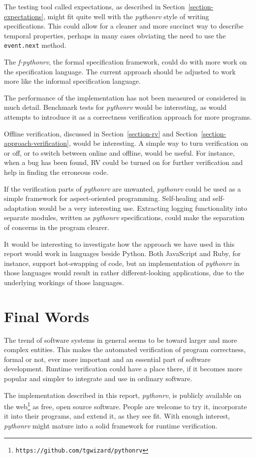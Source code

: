 The testing tool called expectations, as described in
Section~\ref{section-expectations}, might fit quite well with the
\textit{pythonrv} style of writing specifications. This could allow for a
cleaner and more succinct way to describe temporal properties, perhaps in many
cases obviating the need to use the \texttt{event.next} method.

The \textit{f-pythonrv}, the formal specification framework, could do with more
work on the specification language. The current approach should be adjusted to
work more like the informal specification language.

The performance of the implementation has not been measured or considered in
much detail. Benchmark tests for \textit{pythonrv} would be interesting, as
would attempts to introduce it as a correctness verification approach for more
programs.

Offline verification, discussed in Section~\ref{section-rv} and
Section~\ref{section-approach-verification}, would be interesting. A simple way
to turn verification on or off, or to switch between online and offline, would
be useful. For instance, when a bug has been found, RV could be turned on for
further verification and help in finding the erroneous code.

If the verification parts of \textit{pythonrv} are unwanted, \textit{pythonrv}
could be used as a simple framework for aspect-oriented programming.
Self-healing and self-adaptation would be a very interesting use. Extracting
logging functionality into separate modules, written as \textit{pythonrv}
specifications, could make the separation of concerns in the program clearer.

It would be interesting to investigate how the approach we have used in this
report would work in languages beside Python. Both JavaScript and Ruby, for
instance, support hot-swapping of code, but an implementation of
\textit{pythonrv} in those languages would result in rather different-looking
applications, due to the underlying workings of those languages.


\section{Final Words}

The trend of software systems in general seems to be toward larger and more
complex entities. This makes the automated verification of program
correctness, formal or not, ever more important and an essential part of
software development. Runtime verification could have a place there, if it
becomes more popular and simpler to integrate and use in ordinary software.

The implementation described in this report, \textit{pythonrv}, is publicly
available on the web\footnote{\texttt{https://github.com/tgwizard/pythonrv}} as
free, open source software. People are welcome to try it, incorporate it into
their programs, and extend it, as they see fit. With enough interest,
\textit{pythonrv} might mature into a solid framework for runtime verification.

